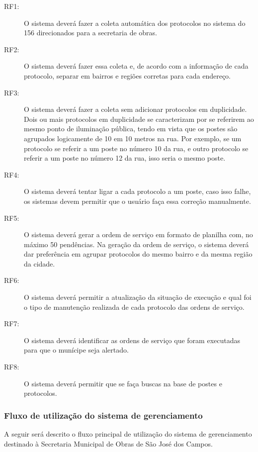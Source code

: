 \documentclass[
	article,			%
	11pt,				%
	oneside,			%
	a4paper,			%
	english,			%
	brazil,				%
	sumario=tradicional
	]{abntex2}
\begin{document}
\begin{description}
\item[RF1:] O sistema deverá fazer a coleta automática dos protocolos no sistema do 156 direcionados para a secretaria de obras.

\item[RF2:] O sistema deverá fazer essa coleta e, de acordo com a informação de cada protocolo, separar em bairros e regiões corretas para cada endereço.

\item[RF3:] O sistema deverá fazer a coleta sem adicionar protocolos em duplicidade.
Dois ou mais protocolos em duplicidade se caracterizam por se referirem ao
mesmo ponto de iluminação pública, tendo em vista que os postes são agrupados
logicamente de 10 em 10 metros na rua. Por exemplo, se um protocolo se referir
a um poste no número 10 da rua, e outro protocolo se referir a um poste no número
12 da rua, isso seria o mesmo poste.

\item[RF4:] O sistema deverá tentar ligar a cada protocolo a um poste, caso isso falhe, os sistemas devem permitir que o usuário faça essa correção manualmente.

\item[RF5:] O sistema deverá gerar a ordem de serviço em formato de planilha com, no máximo 50 pendências.
Na geração da ordem de serviço, o sistema deverá dar preferência em agrupar protocolos do mesmo bairro e da mesma região da cidade.

\item[RF6:] O sistema deverá permitir a atualização da situação de execução e qual foi o tipo de manutenção realizada de cada protocolo das ordens de serviço.

\item[RF7:] O sistema deverá identificar as ordens de serviço que foram executadas para que o munícipe seja alertado.

\item[RF8:] O sistema deverá permitir que se faça buscas na base de postes e protocolos.
\end{description}

\subsubsection{Fluxo de utilização do sistema de gerenciamento}

A seguir será descrito o fluxo principal de utilização do sistema de gerenciamento destinado à Secretaria Municipal de Obras de São José dos Campos.
\end{document}
